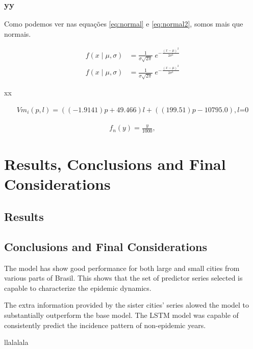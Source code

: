 \documentclass[12pt]{report}
\begin{document}
\subsection{yy}

Como podemos ver nas equações \ref{eq:normal} e \ref{eq:normal2}, somos mais que normais.


\begin{align}\label{eq:normal}
f(x \; | \; \mu, \sigma) &= \frac{1}{\sigma\sqrt{2\pi} } \; e^{ -\frac{(x-\mu)^2}{2\sigma^2} }\\
f(x \; | \; \mu, \sigma) &= \frac{1}{\sigma\sqrt{2\pi} } \; e^{ -\frac{(x-\mu)^2}{2\sigma^2} }
\end{align} \label{eq:normal2}

xx

\begin{align*}
Vm_{i}(p,l) = ((-1.9141)p + 49.466)l + ((199.51)p - 10795.0), \text {$l$=0} \tag{4}
\end{align*}

\begin{align*}
f_{n}(y) = \frac{y}{1000}, \tag{5}
\end{align*}


\newpage
\chapter{Results, Conclusions and Final Considerations}

\newpage
\section{Results}

\newpage
\section{Conclusions and Final Considerations}

The model has show good performance for both large and small cities from 
various parts of Brasil. This shows that the set of predictor series selected 
is capable to characterize the epidemic dynamics.

The extra information provided by the sister cities' series alowed the 
model to substantially outperform the base model. The LSTM model was 
capable of consistently predict the incidence pattern of non-epidemic years. 

\newpage
{}
{}



\newpage
{}
{}
llalalala
\end{document}
